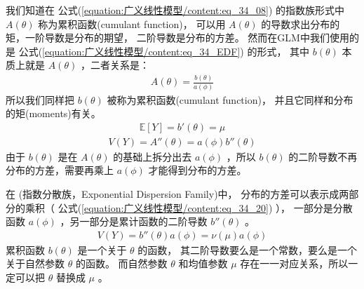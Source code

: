 \documentclass[letterpaper,10pt,english]{sphinxmanual}
\begin{document}
我们知道在 公式(\ref{equation:广义线性模型/content:eq_34_08}) 的指数族形式中 \(A(\theta)\) 称为累积函数(cumulant function)，
可以用 \(A(\theta)\) 的导数求出分布的矩，一阶导数是分布的期望，
二阶导数是分布的方差。
然而在GLM中我们使用的是 公式(\ref{equation:广义线性模型/content:eq_34_EDF}) 的形式，
其中 \(b(\theta)\) 本质上就是 \(A(\theta)\)
，二者关系是：
\begin{equation}\label{equation:广义线性模型/content:广义线性模型/content:4}
\begin{split}A(\theta) = \frac{ b(\theta) }{a(\phi)}\end{split}
\end{equation}
所以我们同样把 \(b(\theta)\) 被称为累积函数(cumulant function)，
并且它同样和分布的矩(moments)有关。
\begin{equation}\label{equation:广义线性模型/content:广义线性模型/content:5}
\begin{split}\mathbb{E}[Y] = b'(\theta)=\mu\end{split}
\end{equation}\begin{equation}\label{equation:广义线性模型/content:eq_34_20}
\begin{split}V(Y) = A''(\theta)=a(\phi)b''(\theta)\end{split}
\end{equation}
由于 \(b(\theta)\) 是在 \(A(\theta)\) 的基础上拆分出去 \(a(\phi)\)
，所以 \(b(\theta)\) 的二阶导数不再分布的方差，需要再乘上 \(a(\phi)\) 才能得到分布的方差。


在  (指数分散族，Exponential Dispersion Family)中，
分布的方差可以表示成两部分的乘积（ 公式(\ref{equation:广义线性模型/content:eq_34_20}) ），
一部分是分散函数 \(a(\phi)\)
，另一部分是累计函数的二阶导数 \(b''(\theta)\) 。
\begin{equation}\label{equation:广义线性模型/content:广义线性模型/content:6}
\begin{split}V(Y)  = b''(\theta) a(\phi) = \nu(\mu)a(\phi)\end{split}
\end{equation}
累积函数 \(b(\theta)\) 是一个关于 \(\theta\) 的函数，
其二阶导数要么是一个常数，要么是一个关于自然参数 \(\theta\) 的函数。
而自然参数 \(\theta\) 和均值参数 \(\mu\)
存在一一对应关系，所以一定可以把 \(\theta\) 替换成 \(\mu\)
。
\end{document}
